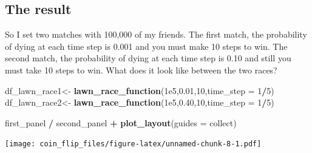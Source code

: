 \documentclass[
]{article}
\newenvironment{Shaded}{\begin{snugshade}}{\end{snugshade}}
\newcommand{\AttributeTok}[1]{\textcolor[rgb]{0.13,0.29,0.53}{#1}}
\newcommand{\DecValTok}[1]{\textcolor[rgb]{0.00,0.00,0.81}{#1}}
\newcommand{\FloatTok}[1]{\textcolor[rgb]{0.00,0.00,0.81}{#1}}
\newcommand{\FunctionTok}[1]{\textcolor[rgb]{0.13,0.29,0.53}{\textbf{#1}}}
\newcommand{\NormalTok}[1]{#1}
\newcommand{\OtherTok}[1]{\textcolor[rgb]{0.56,0.35,0.01}{#1}}
\newcommand{\SpecialCharTok}[1]{\textcolor[rgb]{0.81,0.36,0.00}{\textbf{#1}}}
\newcommand{\StringTok}[1]{\textcolor[rgb]{0.31,0.60,0.02}{#1}}
\begin{document}
\begin{Shaded}
\end{Shaded}

\subsection{The result}\label{the-result}

So I set two matches with 100,000 of my friends. The first match, the
probability of dying at each time step is 0.001 and you must make 10
steps to win. The second match, the probability of dying at each time
step is 0.10 and still you must take 10 steps to win. What does it look
like between the two races?

\begin{Shaded}
\begin{Highlighting}[]
\NormalTok{df\_lawn\_race1}\OtherTok{\textless{}{-}} \FunctionTok{lawn\_race\_function}\NormalTok{(}\FloatTok{1e5}\NormalTok{,}\FloatTok{0.01}\NormalTok{,}\DecValTok{10}\NormalTok{,}\AttributeTok{time\_step =} \DecValTok{1}\SpecialCharTok{/}\DecValTok{5}\NormalTok{)}
\NormalTok{df\_lawn\_race2}\OtherTok{\textless{}{-}} \FunctionTok{lawn\_race\_function}\NormalTok{(}\FloatTok{1e5}\NormalTok{,}\FloatTok{0.40}\NormalTok{,}\DecValTok{10}\NormalTok{,}\AttributeTok{time\_step =} \DecValTok{1}\SpecialCharTok{/}\DecValTok{5}\NormalTok{)}
\end{Highlighting}
\end{Shaded}

\begin{Shaded}
\begin{Highlighting}[]
\NormalTok{first\_panel }\SpecialCharTok{/}\NormalTok{ second\_panel }\SpecialCharTok{+}   \FunctionTok{plot\_layout}\NormalTok{(}\AttributeTok{guides =} \StringTok{\textquotesingle{}collect\textquotesingle{}}\NormalTok{)}
\end{Highlighting}
\end{Shaded}

\texttt{[image: coin\_flip\_files/figure-latex/unnamed-chunk-8-1.pdf]}
\end{document}
